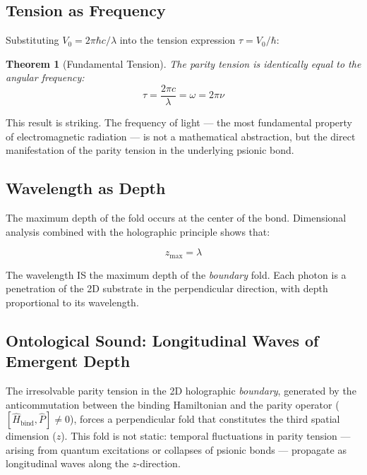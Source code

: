 \documentclass[12pt,a4paper,twoside]{article}
\newtheorem{theorem}{Theorem}[section]
\newcommand{\boundary}{\textit{boundary}}
\begin{document}
\subsection{Tension as Frequency}

Substituting $V_0 = 2\pi\hbar c/\lambda$ into the tension expression $\tau = V_0/\hbar$:

\begin{resultbox}[title={Theorem 3 --- Fundamental Tension}]
\begin{theorem}[Fundamental Tension]\label{thm:tensao}
The parity tension is identically equal to the angular frequency:
\begin{equation}
\boxed{\tau = \frac{2\pi c}{\lambda} = \omega = 2\pi\nu}
\label{eq:tensao_fundamental}
\end{equation}
\end{theorem}
\end{resultbox}

\noindent This result is striking. The frequency of light --- the most fundamental property of electromagnetic radiation --- is not a mathematical abstraction, but the direct manifestation of the parity tension in the underlying psionic bond.

\subsection{Wavelength as Depth}

The maximum depth of the fold occurs at the center of the bond. Dimensional analysis combined with the holographic principle shows that:

\begin{equationbox}[title={Depth--Wavelength Identity}]
\begin{equation}
\boxed{z_{\max} = \lambda}
\label{eq:zmax_lambda}
\end{equation}
\end{equationbox}

\noindent The wavelength IS the maximum depth of the \boundary{} fold. Each photon is a penetration of the 2D substrate in the perpendicular direction, with depth proportional to its wavelength.

\subsection{Ontological Sound: Longitudinal Waves of Emergent Depth}

The irresolvable parity tension in the 2D holographic \boundary, generated by the anticommutation between the binding Hamiltonian and the parity operator ($[\hat{H}_{\text{bind}}, \hat{P}] \neq 0$), forces a perpendicular fold that constitutes the third spatial dimension ($z$). This fold is not static: temporal fluctuations in parity tension --- arising from quantum excitations or collapses of psionic bonds --- propagate as longitudinal waves along the $z$-direction.
\end{document}
